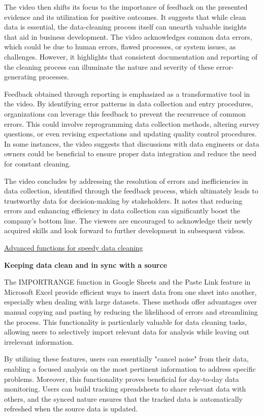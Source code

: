 \documentclass[]{article}
\begin{document}
The video then shifts its focus to the importance of feedback on the presented evidence and its utilization for positive outcomes. It suggests that while clean data is essential, the data-cleaning process itself can unearth valuable insights that aid in business development. The video acknowledges common data errors, which could be due to human errors, flawed processes, or system issues, as challenges. However, it highlights that consistent documentation and reporting of the cleaning process can illuminate the nature and severity of these error-generating processes.

Feedback obtained through reporting is emphasized as a transformative tool in the video. By identifying error patterns in data collection and entry procedures, organizations can leverage this feedback to prevent the recurrence of common errors. This could involve reprogramming data collection methods, altering survey questions, or even revising expectations and updating quality control procedures. In some instances, the video suggests that discussions with data engineers or data owners could be beneficial to ensure proper data integration and reduce the need for constant cleaning.

The video concludes by addressing the resolution of errors and inefficiencies in data collection, identified through the feedback process, which ultimately leads to trustworthy data for decision-making by stakeholders. It notes that reducing errors and enhancing efficiency in data collection can significantly boost the company's bottom line. The viewers are encouraged to acknowledge their newly acquired skills and look forward to further development in subsequent videos.

\uline{Advanced functions for speedy data cleaning}

\textbf{Keeping data clean and in sync with a source}

The IMPORTRANGE function in Google Sheets and the Paste Link feature in Microsoft Excel provide efficient ways to insert data from one sheet into another, especially when dealing with large datasets. These methods offer advantages over manual copying and pasting by reducing the likelihood of errors and streamlining the process. This functionality is particularly valuable for data cleaning tasks, allowing users to selectively import relevant data for analysis while leaving out irrelevant information.

By utilizing these features, users can essentially "cancel noise" from their data, enabling a focused analysis on the most pertinent information to address specific problems. Moreover, this functionality proves beneficial for day-to-day data monitoring. Users can build tracking spreadsheets to share relevant data with others, and the synced nature ensures that the tracked data is automatically refreshed when the source data is updated.
\end{document}
